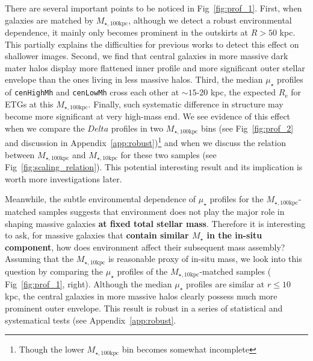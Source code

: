 \documentclass[a4paper,fleqn,usenatbib]{mnras}
\def\rbcg{\texttt{cenHighMh}}
\def\nbcg{\texttt{cenLowMh}}
\def\mstar{{$M_{\star}$}}
\def\minn{{$M_{\star,10\mathrm{kpc}}$}}
\def\mtot{{$M_{\star,100\mathrm{kpc}}$}}
\def\mden{{$\mu_{\star}$}}
\begin{document}
    There are several important points to be noticed in Fig~\ref{fig:prof_1}. 
    First, when galaxies are matched by \mtot{}, although we detect a robust 
    environmental dependence, it mainly only becomes prominent in the outskirts 
    at $R>50$ kpc. 
    This partially explains the difficulties for previous works to detect this effect
    on shallower images. 
    Second, we find that central galaxies in more massive dark mater halos display 
    more flattened inner profile and more significant outer stellar envelope than 
    the ones living in less massive halos. 
    Third, the median \mden{} profiles of \rbcg{} and \nbcg{} cross each other 
    at ${\sim} 15$-20 kpc, the expected $R_{\mathrm{e}}$ for ETGs at this \mtot{}. 
    Finally, such systematic difference in structure may become more significant 
    at very high-mass end. 
    We see evidence of this effect when we compare the $Delta$ profiles in two \mtot{} 
    bins (see Fig~\ref{fig:prof_2} and discussion in 
    Appendix~\ref{app:robust})\footnote{Though the lower \mtot{} bin becomes somewhat
    incomplete} and when we discuss the relation between \mtot{} and \minn{} for 
    these two samples (see Fig~\ref{fig:scaling_relation}). 
    This potential interesting result and its implication is worth more investigations 
    later.  

    Meanwhile, the subtle environmental dependence of \mden{} profiles for the 
    \mtot{}-matched samples suggests that environment does not play the major role in 
    shaping massive galaxies \textbf{at fixed total stellar mass}.
    Therefore it is interesting to ask, for massive galaxies that \textbf{contain 
    similar \mstar{} in the in-situ component}, how does environment affect their 
    subsequent mass assembly?
    Assuming that the \minn{} is reasonable proxy of in-situ mass, we look into this 
    question by comparing the \mden{} profiles of the \minn{}-matched samples ( 
    Fig~\ref{fig:prof_1}, right).  
    Although the median \mden{} profiles are similar at $r \leq 10$ kpc, the
    central galaxies in more massive halos clearly possess much more prominent outer
    envelope. 
    This result is robust in a series of statistical and systematical tests 
    (see Appendix~\ref{app:robust}.
    
\end{document}

